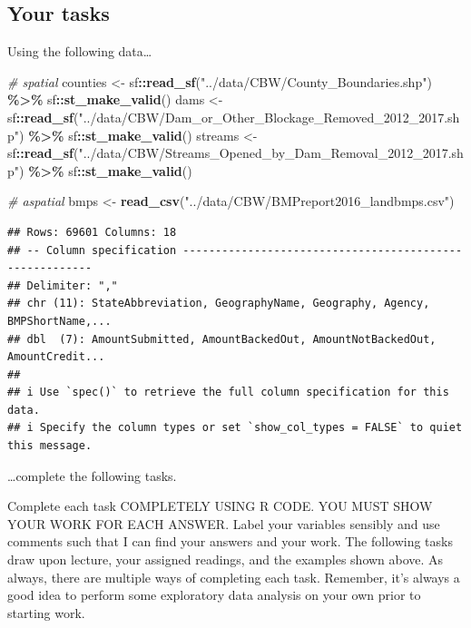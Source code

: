 \documentclass[]{article}
\newenvironment{Shaded}{\begin{snugshade}}{\end{snugshade}}
\newcommand{\CommentTok}[1]{\textcolor[rgb]{0.56,0.35,0.01}{\textit{#1}}}
\newcommand{\FunctionTok}[1]{\textcolor[rgb]{0.13,0.29,0.53}{\textbf{#1}}}
\newcommand{\NormalTok}[1]{#1}
\newcommand{\OtherTok}[1]{\textcolor[rgb]{0.56,0.35,0.01}{#1}}
\newcommand{\SpecialCharTok}[1]{\textcolor[rgb]{0.81,0.36,0.00}{\textbf{#1}}}
\newcommand{\StringTok}[1]{\textcolor[rgb]{0.31,0.60,0.02}{#1}}
\begin{document}
\newpage

\subsection{Your tasks}\label{your-tasks}

Using the following data\ldots{}

\begin{Shaded}
\begin{Highlighting}[]
\CommentTok{\# spatial}
\NormalTok{counties }\OtherTok{\textless{}{-}}\NormalTok{ sf}\SpecialCharTok{::}\FunctionTok{read\_sf}\NormalTok{(}\StringTok{"../data/CBW/County\_Boundaries.shp"}\NormalTok{) }\SpecialCharTok{\%\textgreater{}\%}\NormalTok{ sf}\SpecialCharTok{::}\FunctionTok{st\_make\_valid}\NormalTok{()}
\NormalTok{dams }\OtherTok{\textless{}{-}}\NormalTok{ sf}\SpecialCharTok{::}\FunctionTok{read\_sf}\NormalTok{(}\StringTok{"../data/CBW/Dam\_or\_Other\_Blockage\_Removed\_2012\_2017.shp"}\NormalTok{) }\SpecialCharTok{\%\textgreater{}\%}\NormalTok{ sf}\SpecialCharTok{::}\FunctionTok{st\_make\_valid}\NormalTok{()}
\NormalTok{streams }\OtherTok{\textless{}{-}}\NormalTok{ sf}\SpecialCharTok{::}\FunctionTok{read\_sf}\NormalTok{(}\StringTok{"../data/CBW/Streams\_Opened\_by\_Dam\_Removal\_2012\_2017.shp"}\NormalTok{) }\SpecialCharTok{\%\textgreater{}\%}\NormalTok{ sf}\SpecialCharTok{::}\FunctionTok{st\_make\_valid}\NormalTok{()}

\CommentTok{\# aspatial}
\NormalTok{bmps }\OtherTok{\textless{}{-}} \FunctionTok{read\_csv}\NormalTok{(}\StringTok{"../data/CBW/BMPreport2016\_landbmps.csv"}\NormalTok{)}
\end{Highlighting}
\end{Shaded}

\begin{verbatim}
## Rows: 69601 Columns: 18
## -- Column specification --------------------------------------------------------
## Delimiter: ","
## chr (11): StateAbbreviation, GeographyName, Geography, Agency, BMPShortName,...
## dbl  (7): AmountSubmitted, AmountBackedOut, AmountNotBackedOut, AmountCredit...
## 
## i Use `spec()` to retrieve the full column specification for this data.
## i Specify the column types or set `show_col_types = FALSE` to quiet this message.
\end{verbatim}

\ldots complete the following tasks.

Complete each task COMPLETELY USING R CODE. YOU MUST SHOW YOUR WORK FOR
EACH ANSWER. Label your variables sensibly and use comments such that I
can find your answers and your work. The following tasks draw upon
lecture, your assigned readings, and the examples shown above. As
always, there are multiple ways of completing each task. Remember, it's
always a good idea to perform some exploratory data analysis on your own
prior to starting work.
\end{document}
